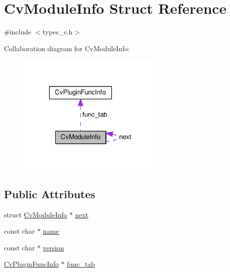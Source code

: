 \hypertarget{structCvModuleInfo}{\section{Cv\-Module\-Info Struct Reference}
\label{structCvModuleInfo}
}


{\ttfamily \#include $<$types\-\_\-c.\-h$>$}



Collaboration diagram for Cv\-Module\-Info\-:\nopagebreak
\begin{figure}[H]
\begin{center}
\leavevmode
\includegraphics[width=205pt]{structCvModuleInfo__coll__graph}
\end{center}
\end{figure}
\subsection*{Public Attributes}
\begin{DoxyCompactItemize}
\item 
struct \hyperlink{structCvModuleInfo}{Cv\-Module\-Info} $\ast$ \hyperlink{structCvModuleInfo_a0af626248a90d6f5dccc2cd3c7a383a5}{next}
\item 
const char $\ast$ \hyperlink{structCvModuleInfo_a91eff988ef5fb7adc70a3829b00be41c}{name}
\item 
const char $\ast$ \hyperlink{structCvModuleInfo_ac0fd309843cd80a46d41e4838c18ad19}{version}
\item 
\hyperlink{structCvPluginFuncInfo}{Cv\-Plugin\-Func\-Info} $\ast$ \hyperlink{structCvModuleInfo_a42b47b9fcdb2fb331ee37e107e485d53}{func\-\_\-tab}
\end{DoxyCompactItemize}


